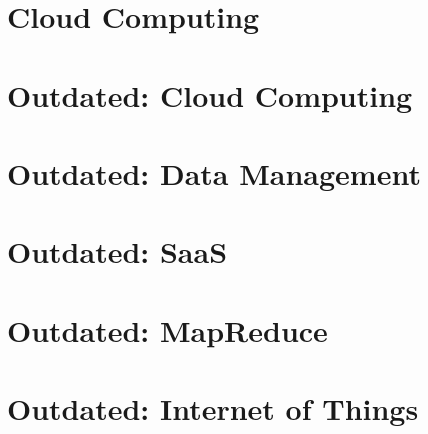 \part{Cloud Computing}





\part{Outdated: Cloud Computing}

%
%





\part{Outdated: Data Management}



\part{Outdated: SaaS}
\label{sec:icloud-saas}



\part{Outdated: MapReduce}





%
%

\part{Outdated: Internet of Things}


